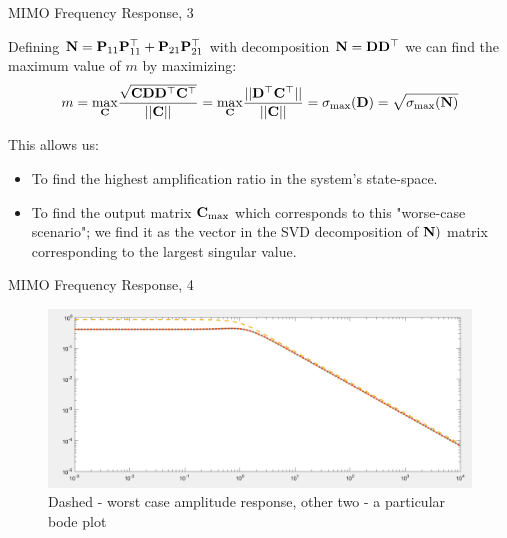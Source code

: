\documentclass{beamer}
\begin{document}
\begin{frame}{MIMO Frequency Response, 3}
	\begin{flushleft}
		
		Defining $\mathbf{N} = \mathbf{P} _{11} \mathbf{P} _{11}^\top +\mathbf{P} _{21} \mathbf{P} _{21}^\top$ with decomposition $\mathbf{N} = \mathbf{D} \mathbf{D}^\top$ we can find the maximum value of $m$ by maximizing:
		\begin{align*}
			m = \underset{\mathbf{C}}{\max } \frac{\sqrt{\mathbf{C} \mathbf{D} \mathbf{D}^\top \mathbf{C}^\top}}{|| \mathbf{C}||}
			=
			\underset{\mathbf{C}}{\max } \frac{||\mathbf{D}^\top \mathbf{C}^\top||}{|| \mathbf{C}||} = \sigma_{\max}(\mathbf{D}) =\sqrt{ \sigma_{\max}(\mathbf{N})}
		\end{align*}		
		
		This allows us:
		
		\begin{itemize}
			\item To find the highest amplification ratio in the system's state-space.
			
			\item To find the output matrix $\mathbf{C}_{\max}$ which corresponds to this "worse-case scenario"; we find it as the vector in the SVD decomposition of $\mathbf{N})$ matrix corresponding to the largest singular value.
		\end{itemize}
		
	\end{flushleft}
\end{frame}



\begin{frame}{MIMO Frequency Response, 4}
	\begin{flushleft}
		
		\begin{figure}
			\centering
			\includegraphics[width=1 \linewidth]{WorstCaseAmp}
			\caption{Dashed - worst case amplitude response, other two - a particular bode plot}
			\label{fig:worstcaseamp}
		\end{figure}
		
		
	\end{flushleft}
\end{frame}
\end{document}
